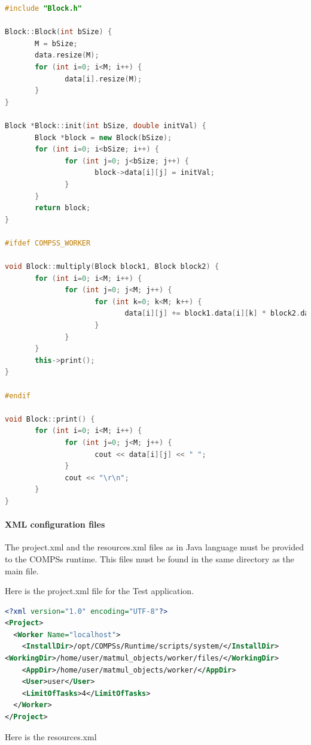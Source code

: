 \begin{lstlisting}[language=C++]
#include "Block.h"

Block::Block(int bSize) {
       M = bSize;
       data.resize(M);
       for (int i=0; i<M; i++) {
              data[i].resize(M);
       }
}

Block *Block::init(int bSize, double initVal) {
       Block *block = new Block(bSize);
       for (int i=0; i<bSize; i++) {
              for (int j=0; j<bSize; j++) {
                     block->data[i][j] = initVal;
              }
       }
       return block;
}

#ifdef COMPSS_WORKER

void Block::multiply(Block block1, Block block2) {
       for (int i=0; i<M; i++) {
              for (int j=0; j<M; j++) {
                     for (int k=0; k<M; k++) {
                            data[i][j] += block1.data[i][k] * block2.data[k][j];
                     }
              }
       }
       this->print();
}

#endif

void Block::print() {
       for (int i=0; i<M; i++) {
              for (int j=0; j<M; j++) {
                     cout << data[i][j] << " ";
              }
              cout << "\r\n";
       }
}
\end{lstlisting}

\paragraph{XML configuration files}
The project.xml and the resources.xml files as in Java language must be provided to the COMPSs runtime. 
This files must be found in the same directory as the main file.

Here is the project.xml file for the Test application.

\begin{lstlisting}[language=xml] 
<?xml version="1.0" encoding="UTF-8"?>
<Project>
  <Worker Name="localhost">
    <InstallDir>/opt/COMPSs/Runtime/scripts/system/</InstallDir>
<WorkingDir>/home/user/matmul_objects/worker/files/</WorkingDir>
    <AppDir>/home/user/matmul_objects/worker/</AppDir>
    <User>user</User>
    <LimitOfTasks>4</LimitOfTasks>
  </Worker>
</Project>
\end{lstlisting}

Here is the resources.xml


